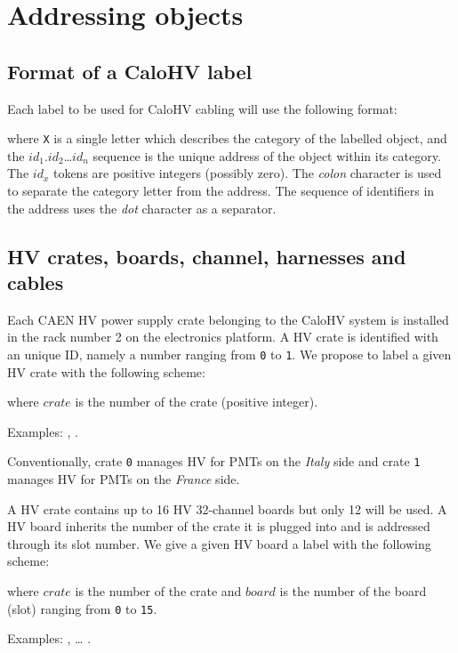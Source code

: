 
\section{Addressing objects}

\subsection{Format of a CaloHV label}

Each label to be used for CaloHV cabling will use the following format:

\begin{center}
\end{center}
\noindent  where \texttt{X}  is a  single letter  which describes  the
category  of the  labelled  object,  and the  $id_1$.$id_2$\dots$id_n$
sequence is the unique address of the object within its category.  The
$id_x$ tokens are positive integers (possibly zero).  The \emph{colon}
character is  used to separate  the category letter from  the address.
The  sequence  of  identifiers  in  the  address  uses  the  \emph{dot}
character as a separator.


\subsection{HV crates, boards, channel, harnesses and cables}

Each CAEN HV power supply crate belonging to the CaloHV system is installed
in the rack number 2 on the electronics platform.
A HV crate is identified with an unique ID, namely
a number ranging from \texttt{0} to \texttt{1}.  We propose to label a
given HV crate with the following scheme:
\begin{center}
 \end{center}
where \texttt{$crate$} is the number of the crate (positive integer).
\vskip     10pt    \par\noindent     Examples:    ,
.  \par Conventionally, crate \texttt{0} manages HV
for PMTs on the \emph{Italy} side  and crate \texttt{1} manages HV for
PMTs on the \emph{France} side.

\vskip 10pt A HV crate contains up to 16 HV 32-channel boards but only 12
will be  used.  A  HV board  inherits the  number of  the crate  it is
plugged into  and is addressed through  its slot number.  We give a given HV board
a label with the following scheme:
\begin{center}
 \end{center}
where \texttt{$crate$} is the number of the crate and \texttt{$board$}
is  the  number  of  the  board  (slot)  ranging  from  \texttt{0}  to
\texttt{15}.
\vskip 10pt
\par\noindent Examples: ,  \dots
{}.

